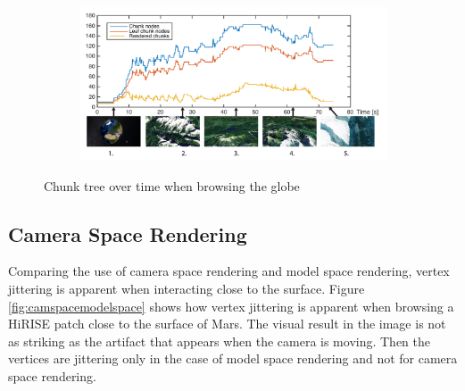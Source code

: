 \begin{figure}[h]
    \centering
    \begin{subfigure}[bt]{1.0\textwidth}
        \includegraphics[width=\textwidth]{figures/results/globebrowsing.pdf}
    \end{subfigure}
    \caption{Chunk tree over time when browsing the globe}
    \label{fig:interaction}
\end{figure}

\subsection{Camera Space Rendering}

Comparing the use of camera space rendering and model space rendering, vertex jittering is apparent when interacting close to the surface. Figure \ref{fig:camspacemodelspace} shows how vertex jittering is apparent when browsing a HiRISE patch close to the surface of Mars. The visual result in the image is not as striking as the artifact that appears when the camera is moving. Then the vertices are jittering only in the case of model space rendering and not for camera space rendering. 

